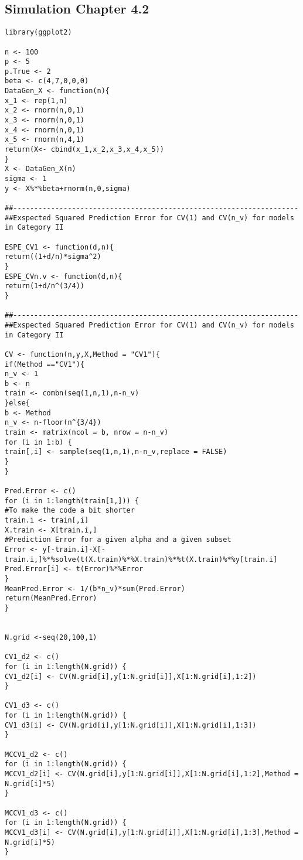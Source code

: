 \documentclass[Research_Module_ES.tex]{subfiles}
\begin{document}
\subsection*{Simulation Chapter 4.2}
\begin{lstlisting}[title={Simulation Graphic Ilustration Exspected Squared Prediction Error CV1 and CV($n_\nu$)}]
library(ggplot2)

n <- 100
p <- 5
p.True <- 2
beta <- c(4,7,0,0,0)
DataGen_X <- function(n){
x_1 <- rep(1,n)         
x_2 <- rnorm(n,0,1)
x_3 <- rnorm(n,0,1)
x_4 <- rnorm(n,0,1)
x_5 <- rnorm(n,4,1)
return(X<- cbind(x_1,x_2,x_3,x_4,x_5))
}
X <- DataGen_X(n)
sigma <- 1
y <- X%*%beta+rnorm(n,0,sigma)

##--------------------------------------------------------------------
##Exspected Squared Prediction Error for CV(1) and CV(n_v) for models in Category II

ESPE_CV1 <- function(d,n){
return((1+d/n)*sigma^2)
}
ESPE_CVn.v <- function(d,n){
return(1+d/n^(3/4))
}

##--------------------------------------------------------------------
##Exspected Squared Prediction Error for CV(1) and CV(n_v) for models in Category II

CV <- function(n,y,X,Method = "CV1"){
if(Method =="CV1"){
n_v <- 1
b <- n
train <- combn(seq(1,n,1),n-n_v)
}else{
b <- Method
n_v <- n-floor(n^{3/4})
train <- matrix(ncol = b, nrow = n-n_v)
for (i in 1:b) {
train[,i] <- sample(seq(1,n,1),n-n_v,replace = FALSE)
}
}

Pred.Error <- c()
for (i in 1:length(train[1,])) {
#To make the code a bit shorter
train.i <- train[,i]                 
X.train <- X[train.i,]    
#Prediction Error for a given alpha and a given subset
Error <- y[-train.i]-X[-train.i,]%*%solve(t(X.train)%*%X.train)%*%t(X.train)%*%y[train.i]
Pred.Error[i] <- t(Error)%*%Error
}
MeanPred.Error <- 1/(b*n_v)*sum(Pred.Error)
return(MeanPred.Error)
}


N.grid <-seq(20,100,1)

CV1_d2 <- c()
for (i in 1:length(N.grid)) {
CV1_d2[i] <- CV(N.grid[i],y[1:N.grid[i]],X[1:N.grid[i],1:2])
}

CV1_d3 <- c()
for (i in 1:length(N.grid)) {
CV1_d3[i] <- CV(N.grid[i],y[1:N.grid[i]],X[1:N.grid[i],1:3])
}

MCCV1_d2 <- c()
for (i in 1:length(N.grid)) {
MCCV1_d2[i] <- CV(N.grid[i],y[1:N.grid[i]],X[1:N.grid[i],1:2],Method = N.grid[i]*5)
}

MCCV1_d3 <- c()
for (i in 1:length(N.grid)) {
MCCV1_d3[i] <- CV(N.grid[i],y[1:N.grid[i]],X[1:N.grid[i],1:3],Method = N.grid[i]*5)
}


\end{lstlisting}
\end{document}
